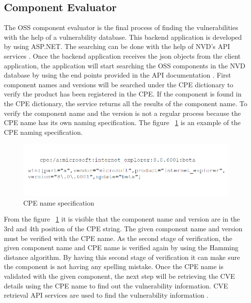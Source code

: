 \subsection{Component Evaluator}
The \acs{OSS} component evaluator is the final process of finding the vulnerabilities with the help of a vulnerability database. This backend application is developed by using ASP.NET. The searching can be done with the help of \acs{NVD}'s API services \cite{NVDApi}. Once the backend application receives the json objects from the client application, the application will start searching the OSS components in the \acs{NVD} database by using the end points provided in the API documentation \cite{NVDApi}. First component names and versions will be searched under the \acs{CPE} dictionary to verify the product has been registered in the \acs{CPE}. If the component is found in the \acs{CPE} dictionary, the service returns all the results of the component name. To verify the component name and the version is not a regular process because the \acs{CPE} name has its own naming specification. The figure ~\ref{fig:cpe_name} is an example of the \acs{CPE} naming specification.
 \begin{figure}[h!]
	\includegraphics[width=15cm]{includes/cpe_name.png}
	\centering
	\caption{CPE name specification}
	\label{fig:cpe_name}
\end{figure}
From the figure ~\ref{fig:cpe_name} it is visible that the component name and version are in the 3rd and 4th position of the \acs{CPE} string. The given component name and version must be verified with the \acs{CPE} name. As the second stage of verification, the given component name and \acs{CPE} name is verified again by using the Hamming distance algorithm. By having this second stage of verification it can make sure the component is not having any spelling mistake. Once the \acs{CPE} name is validated with the given component, the next step will be retrieving the \acs{CVE} details using the \acs{CPE} name to find out the vulnerability information. \acs{CVE} retrieval API services are used to find the vulnerability information \cite{NVDApi}. 

